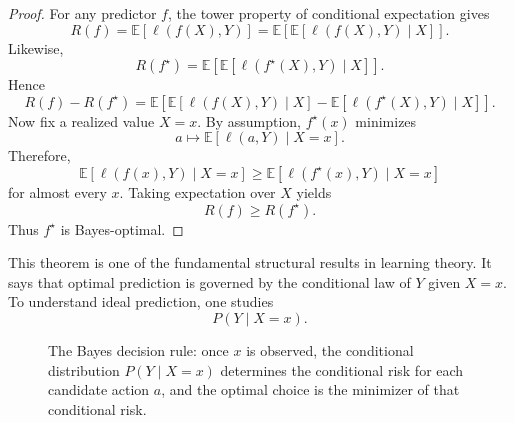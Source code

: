\begin{proof}
For any predictor $f$, the tower property of conditional expectation gives
\[
R(f)=\mathbb E[\ell(f(X),Y)]
=
\mathbb E\!\left[\mathbb E[\ell(f(X),Y)\mid X]\right].
\]
Likewise,
\[
R(f^\star)=
\mathbb E\!\left[\mathbb E[\ell(f^\star(X),Y)\mid X]\right].
\]
Hence
\[
R(f)-R(f^\star)
=
\mathbb E\!\left[
\mathbb E[\ell(f(X),Y)\mid X]
-
\mathbb E[\ell(f^\star(X),Y)\mid X]
\right].
\]
Now fix a realized value $X=x$. By assumption, $f^\star(x)$ minimizes
\[
a\mapsto \mathbb E[\ell(a,Y)\mid X=x].
\]
Therefore,
\[
\mathbb E[\ell(f(x),Y)\mid X=x]
\ge
\mathbb E[\ell(f^\star(x),Y)\mid X=x]
\]
for almost every $x$. Taking expectation over $X$ yields
\[
R(f)\ge R(f^\star).
\]
Thus $f^\star$ is Bayes-optimal.
\end{proof}

This theorem is one of the fundamental structural results in learning theory. It says that optimal prediction is governed by the conditional law of $Y$ given $X=x$. To understand ideal prediction, one studies
\[
P(Y\mid X=x).
\]

\begin{figure}[tbp]
\centering
{}
\caption{The Bayes decision rule: once $x$ is observed, the conditional distribution $P(Y\mid X=x)$ determines the conditional risk for each candidate action $a$, and the optimal choice is the minimizer of that conditional risk.}
\end{figure}

